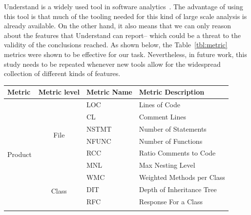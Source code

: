 \documentclass[10pt,journal,compsoc]{IEEEtran}
\begin{document}
Understand is a widely used tool in software analytics~\cite{Zhang16aa,gizas2012comparative,fontana2011experience,orru2015curated,pattison2008talk,malloy2002testing}.
 The advantage of using this tool is that much of the tooling needed for this kind of large scale analysis is already available. On the other hand, it also means that we can only reason about the features that Understand can report-- which could be  a threat to the validity of the conclusions reached. As shown below, the Table~\ref{tbl:metric} metrics were shown to be effective for our task. Nevertheless, in future work, this study needs to be repeated whenever new tools allow for the widespread collection of different kinds of features.
 
\begin{table}[!t]
 

\scriptsize
\begin{tabular}{|p{1cm}|c|l|p{3cm}|}
\hline
\multicolumn{1}{|l|}{\textbf{Metric}}        & \multicolumn{1}{l|}{\textbf{Metric level}} & \textbf{Metric Name} &\textbf{ Metric Description}             \\ \hline
\multirow{21}{*}{Product   } & \multirow{6}{*}{File}             & LOC         & Lines of Code                  \\ \cline{3-4} 
                                  &                                   & CL          & Comment Lines                  \\ \cline{3-4} 
                                  &                                   & NSTMT       & Number of Statements           \\ \cline{3-4} 
                                  &                                   & NFUNC       & Number of Functions            \\ \cline{3-4} 
                                  &                                   & RCC         & Ratio Comments to Code         \\ \cline{3-4} 
                                  &                                   & MNL         & Max Nesting Level              \\ \cline{2-4} 
                                  & \multirow{12}{*}{Class}           & WMC         & Weighted Methods per Class     \\ \cline{3-4} 
                                  &                                   & DIT         & Depth of Inheritance Tree      \\ \cline{3-4} 
                                  &                                   & RFC         & Response For a Class           \\ \cline{3-4} 

\end{tabular}
\end{table}
\end{document}
